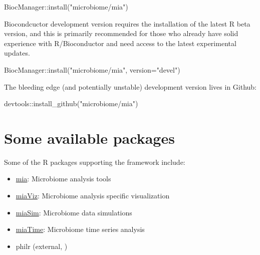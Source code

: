 \documentclass[
]{book}
\newenvironment{Shaded}{\begin{snugshade}}{\end{snugshade}}
\newcommand{\AttributeTok}[1]{\textcolor[rgb]{0.77,0.63,0.00}{#1}}
\newcommand{\FunctionTok}[1]{\textcolor[rgb]{0.00,0.00,0.00}{#1}}
\newcommand{\NormalTok}[1]{#1}
\newcommand{\SpecialCharTok}[1]{\textcolor[rgb]{0.00,0.00,0.00}{#1}}
\newcommand{\StringTok}[1]{\textcolor[rgb]{0.31,0.60,0.02}{#1}}
\providecommand{\tightlist}{%
  \setlength{\itemsep}{0pt}\setlength{\parskip}{0pt}}
\begin{document}
\begin{Shaded}
\begin{Highlighting}[]
\NormalTok{BiocManager}\SpecialCharTok{::}\FunctionTok{install}\NormalTok{(}\StringTok{"microbiome/mia"}\NormalTok{)}
\end{Highlighting}
\end{Shaded}

Biocondcuctor development version requires the installation of the
latest R beta version, and this is primarily recommended for those who
already have solid experience with R/Bioconductor and need access to
the latest experimental updates.

\begin{Shaded}
\begin{Highlighting}[]
\NormalTok{BiocManager}\SpecialCharTok{::}\FunctionTok{install}\NormalTok{(}\StringTok{"microbiome/mia"}\NormalTok{, }\AttributeTok{version=}\StringTok{"devel"}\NormalTok{)}
\end{Highlighting}
\end{Shaded}

The bleeding edge (and potentially unstable) development version lives
in Github:

\begin{Shaded}
\begin{Highlighting}[]
\NormalTok{devtools}\SpecialCharTok{::}\FunctionTok{install\_github}\NormalTok{(}\StringTok{"microbiome/mia"}\NormalTok{)}
\end{Highlighting}
\end{Shaded}

\hypertarget{some-available-packages}{%
\section{Some available packages}\label{some-available-packages}}

Some of the R packages supporting the framework include:

\begin{itemize}
\tightlist
\item
  \href{microbiome.github.io/mia}{mia}: Microbiome analysis tools \citep{R-mia}
\item
  \href{microbiome.github.io/miaViz}{miaViz}: Microbiome analysis specific visualization \citep{Ernst2022}
\item
  \href{microbiome.github.io/miaSim}{miaSim}: Microbiome data simulations \citep{Simsek2021}
\item
  \href{microbiome.github.io/miaTime}{miaTime}: Microbiome time series analysis \citep{Lahti2021}
\item
  philr (external, \citet{Silverman2017})
\end{itemize}
\end{document}
